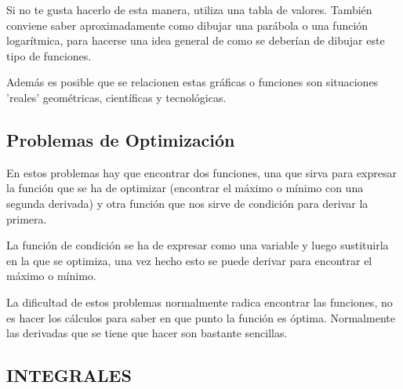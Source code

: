 \documentclass[arial,a4paper,print]{article}
\begin{document}
\begin{enumerate}
Si no te gusta hacerlo de esta manera, utiliza una tabla de valores. También conviene saber aproximadamente como dibujar una parábola o una función logarítmica, para hacerse una idea general de como se deberían de dibujar este tipo de funciones. 

Además es posible que se relacionen estas gráficas o funciones son situaciones 'reales' geométricas, científicas y tecnológicas.


\subsection{Problemas de Optimización}
En estos problemas hay que encontrar dos funciones, una que sirva para expresar la función que se ha de optimizar (encontrar el máximo o mínimo con una segunda derivada) y otra función que nos sirve de condición para derivar la primera. 

La función de condición se ha de expresar como una variable y luego sustituirla en la que se optimiza, una vez hecho esto se puede derivar para encontrar el máximo o mínimo. 

La dificultad de estos problemas normalmente radica encontrar las funciones, no es hacer los cálculos para saber en que punto la función es óptima. Normalmente las derivadas que se tiene que hacer son bastante sencillas.  

\subsection{INTEGRALES}




\end{enumerate}
\end{document}
